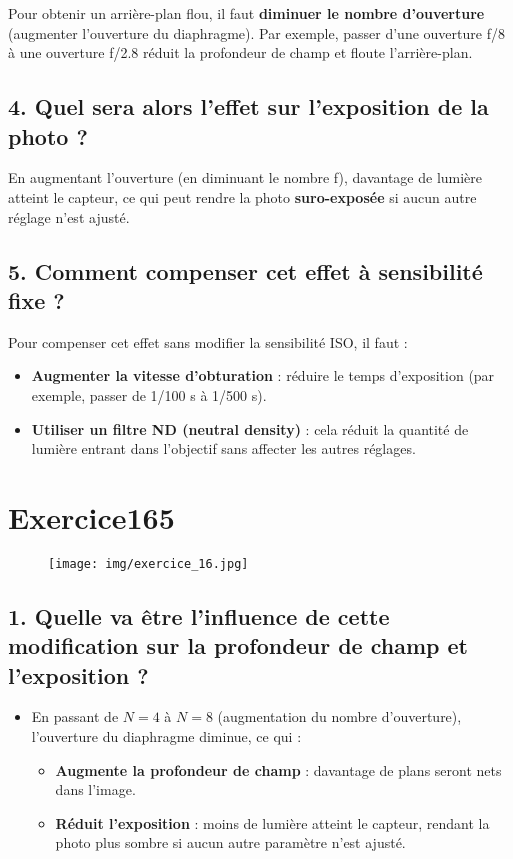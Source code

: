 \documentclass[answers]{exam}
\begin{document}
Pour obtenir un arrière-plan flou, il faut \textbf{diminuer le nombre d'ouverture} (augmenter l'ouverture du diaphragme). Par exemple, passer d'une ouverture f/8 à une ouverture f/2.8 réduit la profondeur de champ et floute l'arrière-plan.

\subsection*{4. Quel sera alors l'effet sur l'exposition de la photo ?}

En augmentant l'ouverture (en diminuant le nombre f), davantage de lumière atteint le capteur, ce qui peut rendre la photo \textbf{suro-exposée} si aucun autre réglage n'est ajusté.

\subsection*{5. Comment compenser cet effet à sensibilité fixe ?}

Pour compenser cet effet sans modifier la sensibilité ISO, il faut :
\begin{itemize}
    \item \textbf{Augmenter la vitesse d'obturation} : réduire le temps d'exposition (par exemple, passer de 1/100 s à 1/500 s).
    \item \textbf{Utiliser un filtre ND (neutral density)} : cela réduit la quantité de lumière entrant dans l'objectif sans affecter les autres réglages.
\end{itemize}

\section*{Exercice165}

\begin{figure}[H]
  \centering
  \texttt{[image: img/exercice\_16.jpg]}
\end{figure}


\subsection*{1. Quelle va être l'influence de cette modification sur la profondeur de champ et l'exposition ?}

\begin{itemize}
    \item En passant de \( N = 4 \) à \( N = 8 \) (augmentation du nombre d'ouverture), l'ouverture du diaphragme diminue, ce qui :
    \begin{itemize}
        \item \textbf{Augmente la profondeur de champ} : davantage de plans seront nets dans l'image.
        \item \textbf{Réduit l'exposition} : moins de lumière atteint le capteur, rendant la photo plus sombre si aucun autre paramètre n'est ajusté.
    \end{itemize}
\end{itemize}
\end{document}
